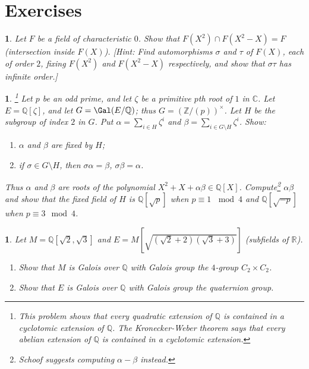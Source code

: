 \documentclass[a4paper,11pt,final,openany]{memoir}
\newtheorem{exercise}[Y]{}
\theoremstyle{nonumberplain}
\begin{document}
\section{Exercises}

\begin{exercise}
\label{x11} Let $F$ be a field of characteristic $0$. Show that $F(X^{2})\cap
F(X^{2}-X)=F$ (intersection inside $F(X)$). [Hint: Find automorphisms $\sigma$
and $\tau$ of $F(X)$, each of order $2$, fixing $F(X^{2})$ and $F(X^{2}-X)$
respectively, and show that $\sigma\tau$ has infinite order.]
\end{exercise}

\begin{exercise}
\label{x12}\footnote{This problem shows that every quadratic extension of
${\mathbb{Q}}$ is contained in a cyclotomic extension of ${\mathbb{Q}}$. The
Kronecker-Weber theorem says that \textit{every} abelian extension of
${\mathbb{Q}}$ is contained in a cyclotomic extension.} Let $p$ be an odd
prime, and let $\zeta$ be a primitive $p$th root of $1$ in $\mathbb{C}$. Let
$E={\mathbb{Q}}[\zeta]$, and let $G=\Gal(E/{\mathbb{Q}})$; thus $G=(\mathbb{Z}%
/(p))^{\times}$. Let $H$ be the subgroup of index $2$ in $G$. Put $\alpha
=\sum_{i\in H}\zeta^{i}$ and $\beta=\sum_{i\in G\setminus H}\zeta^{i}$. Show:

\begin{enumerate}
\item $\alpha$ and $\beta$ are fixed by $H$;

\item if $\sigma\in G\setminus H$, then $\sigma\alpha=\beta$, $\sigma
\beta=\alpha$.
\end{enumerate}

\noindent Thus $\alpha$ and $\beta$ are roots of the polynomial $X^{2}%
+X+\alpha\beta\in{\mathbb{Q}}[X]$. Compute\footnote{Schoof suggests computing
$\alpha-\beta$ instead.} $\alpha\beta$ and show that the fixed field of $H$ is
${\mathbb{Q}}[\sqrt{p}]$ when $p\equiv1\,\mod4$ and ${\mathbb{Q}}[\sqrt{-p}]$
when $p\equiv3\mod4$.
\end{exercise}

\begin{exercise}
\label{x13} Let $M={\mathbb{Q}}[\sqrt{2},\sqrt{3}]$ and $E=M[\sqrt{(\sqrt
{2}+2)(\sqrt{3}+3)}]$ (subfields of $\mathbb{R}$).

\begin{enumerate}
\item Show that $M$ is Galois over ${\mathbb{Q}}$ with Galois group the
$4$-group $C_{2}\times C_{2}$.

\item Show that $E$ is Galois over ${\mathbb{Q}}$ with Galois group the
quaternion group.
\end{enumerate}
\end{exercise}
\end{document}
